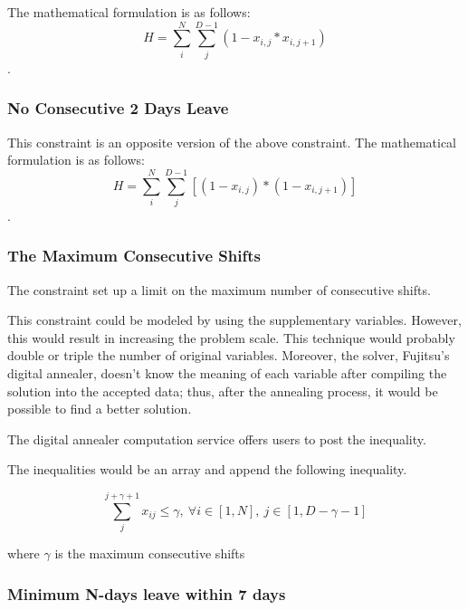 \documentclass[11pt, oneside]{article}   	%
\begin{document}
The mathematical formulation is as follows:
$$H = \sum_{i}^N\sum_{j}^{D-1}\left(1-x_{i,j} * x_{i,j+1}\right)$$.

\subsubsection{No Consecutive 2 Days Leave}

This constraint is an opposite version of the above constraint. The mathematical formulation is as follows:
$$H = \sum_{i}^N\sum_{j}^{D-1}\left[(1-x_{i,j}) * (1 - x_{i,j+1})\right]$$.

\subsubsection{The Maximum Consecutive Shifts}

The constraint set up a limit on the maximum number of consecutive shifts. 

This constraint could be modeled by using the supplementary variables. However, this would result in increasing the problem scale. This technique would probably double or triple the number of original variables. Moreover, the solver, Fujitsu's digital annealer, doesn't know the meaning of each variable after compiling the solution into the accepted data; thus, after the annealing process, it would be possible to find a better solution.

The digital annealer computation service offers users to post the inequality.

The inequalities would be an array and append the following inequality.

$$\sum_{j}^{j+\gamma + 1}x_{ij} \leq \gamma, \   \forall i\in[1, N],\  j\in [1, D-\gamma - 1]$$

where $\gamma$ is the maximum consecutive shifts

\subsubsection{Minimum N-days leave within 7 days}
\end{document}
